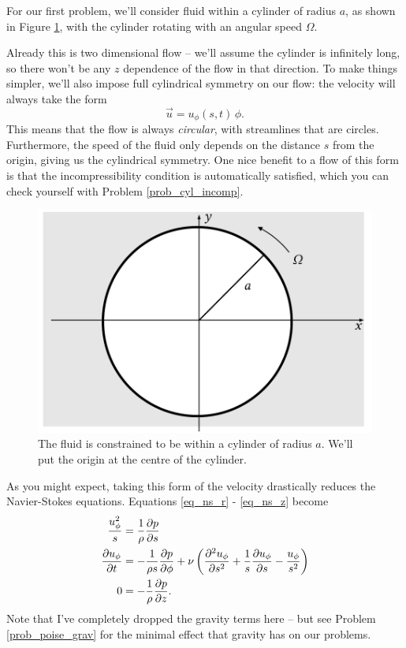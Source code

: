 For our first problem, we'll consider fluid within a cylinder of radius $a$, as shown in Figure \ref{fig_cyl_setup}, with the cylinder rotating with an angular speed $\Omega$. 

Already this is two dimensional flow -- we'll assume the cylinder is infinitely long, so there won't be any $z$ dependence of the flow in that direction.  To make things simpler, we'll also impose full cylindrical symmetry on our flow:  the velocity will always take the form
\begin{equation}
\vec{u} = u_\phi (s, t) \, \unit{\phi}.
\end{equation}
This means that the flow is always \emph{circular}, with streamlines that are circles.  Furthermore, the speed of the fluid only depends on the distance $s$ from the origin, giving us the cylindrical symmetry.  One nice benefit to a flow of this form is that the incompressibility condition is automatically satisfied, which you can check yourself with Problem \ref{prob_cyl_incomp}.

\begin{figure}
\centering
\includegraphics[width=0.7\linewidth]{Figures/Chapter2/fig_cyl_setup}
\caption{The fluid is constrained to be within a cylinder of radius $a$.  We'll put the origin at the centre of the cylinder.}
\label{fig_cyl_setup}
\end{figure}

As you might expect, taking this form of the velocity drastically reduces the Navier-Stokes equations.  Equations \ref{eq_ns_r} - \ref{eq_ns_z} become
\begin{align}
\frac{u_\phi^2}{s} & = \frac{1}{\rho} \frac{\partial {p}}{\partial {s}} \\
\label{eq_ns_theta2}
\frac{\partial {u_\phi}}{\partial {t}} & = -\frac{1}{\rho s} \frac{\partial {p}}{\partial {\phi}} + \nu \left( \frac{\partial^2 {u_\phi}}{\partial {s}^2} + \frac{1}{s} \frac{\partial {u_\phi}}{\partial {s}} - \frac{u_\phi}{s^2} \right) \\
\label{eq_ns_z2}
0 & = -\frac{1}{\rho} \frac{\partial {p}}{\partial {z}}.
\end{align}
Note that I've completely dropped the gravity terms here -- but see Problem \ref{prob_poise_grav} for the minimal effect that gravity has on our problems.

